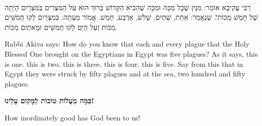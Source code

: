 \ \\

רַבִּי עֲקִיבֶא אוֹמֵר: מִנַּיִן שֶׁכָּל מַכָּה וּמַכָּה שֶׁהֵבִיא הַקָּדוֹשׁ בָּרוּךְ הוּא עַל הַמִּצְרִים בְּמִצְרַיִם הָיְתָה שֶׁל חָמֵשׁ מַכּוֹת? שֶׁנֶּאֱמַר:
אַחַת,
שְׁתַּיִם,
שָׁלֹשׁ,
אַרְבַּע,
חָמֵשׁ. אֱמוֹר מֵעַתָּה: בְּמִצְרַיִם לָקוּ חֲמִשִּׁים מַכּוֹת וְעַל הַיָּם לָקוּ חֲמִשִּׁים וּמָאתַיִם מַכּוֹת.

\begin{english}
Rabbi Akiva says: How do you know that each and every plague that the Holy Blessed One brought on the Egyptians in Egypt was five plagues? As it says,   this is one.  this is two.  this is three.  this is four.  this is five. Say from this that in Egypt they were struck by fifty plagues and at the sea, two hundred and fifty plagues.
\end{english}

\vspace{4em}

{\bf
כַּמָּה מַעֲלוֹת טוֹבוֹת לַמָּקוֹם עָלֵינוּ!
}

\begin{english}
How inordinately good has God been to us!
\end{english}


